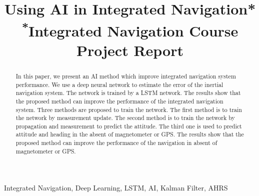 \documentclass[conference]{IEEEtran}
\begin{document}
\title{Using AI in Integrated Navigation*\\
{\footnotesize \textsuperscript{*}Integrated Navigation Course Project Report}
}

\author{
\and
{}
}

\maketitle

\begin{abstract}
    In this paper, we present an AI method which improve integrated navigation system performance. We use a deep neural network to estimate the error of the inertial navigation system. The network is trained by a LSTM network. The results show that the proposed method can improve the performance of the integrated navigation system. Three methods are proposed to train the network. The first method is to train the network by measurement update. The second method is to train the network by propagation and measurement to predict the attitude. The third one is used to predict attitude and heading in the absent of magnetometer or GPS. The results show that the proposed method can improve the performance of the navigation in absent of magnetometer or GPS. 
\end{abstract}

\begin{IEEEkeywords}
    Integrated Navigation, Deep Learning, LSTM, AI, Kalman Filter, AHRS
\end{IEEEkeywords}
\end{document}
